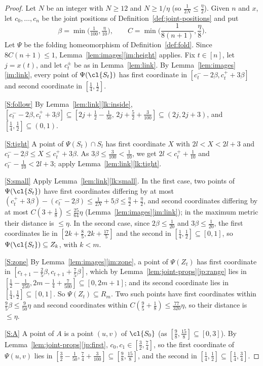 \begin{proof}
Let $N$ be an integer with $N\ge12$ and $N\ge1/\eta$ (so $\frac1{2N}\le\frac\eta2$). Given $n$ and $x$,
let $c_0,\dots,c_n$ be the joint positions of Definition~\ref{def:joint-positions} and put
\[
\beta=\min\big(\tfrac1{100},\tfrac\eta{10}\big),\qquad C=\min\Big(\frac1{8(n+1)},\frac\eta8\Big).
\]
Let $\Psi$ be the folding homeomorphism of Definition~\ref{def:fold}. Since $8C(n+1)\le1$,
Lemma~\ref{lem:images}\ref{im:height} applies. Fix $t\in[n]$, let $j=x(t)$, and let
$c_t^\pm$ be as in Lemma~\ref{lem:link}. By Lemma~\ref{lem:images}\ref{im:link}, every point of
$\Psi(\cl{S_t})$ has first coordinate in $[c_t^--2\beta,c_t^++3\beta]$ and second coordinate in
$[\frac14,\frac12]$.

\ref{S:follow} By Lemma~\ref{lem:link}\ref{lk:inside}, $[c_t^--2\beta,c_t^++3\beta]\subseteq
[2j+\frac12-\frac1{50},\,2j+\frac52+\frac3{100}]\subseteq(2j,2j+3)$, and $[\frac14,\frac12]\subseteq(0,1)$.

\ref{S:tight} A point of $\Psi(S_t)\cap S_l$ has first coordinate $X$ with $2l<X<2l+3$ and
$c_t^--2\beta\le X\le c_t^++3\beta$. As $3\beta\le\frac3{100}<\frac1{10}$, we get
$2l<c_t^++\frac1{10}$ and $c_t^--\frac1{10}<2l+3$; apply Lemma~\ref{lem:link}\ref{lk:tight}.

\ref{S:small} Apply Lemma~\ref{lem:link}\ref{lk:small}. In the first case, two points of
$\Psi(\cl{S_t})$ have first coordinates differing by at most $(c_t^++3\beta)-(c_t^--2\beta)\le
\frac1{2N}+5\beta\le\frac\eta2+\frac\eta2$, and second coordinates differing by at most
$C(3+\frac18)\le\frac{25}{64}\eta$ (Lemma~\ref{lem:images}\ref{im:link}); in the maximum metric
their distance is $\le\eta$. In the second case, since $2\beta\le\frac1{20}$ and $3\beta\le\frac1{20}$,
the first coordinates lie in $[2k+\frac85,2k+\frac{17}5]$ and the second in $[\frac14,\frac12]\subseteq
[0,1]$, so $\Psi(\cl{S_t})\subseteq Z_k$, with $k<m$.

\ref{S:zone} By Lemma~\ref{lem:images}\ref{im:zone}, a point of $\Psi(Z_t)$ has first coordinate in
$[c_{t+1}-\frac25\beta,c_{t+1}+\frac75\beta]$, which by Lemma~\ref{lem:joint-props}\ref{jp:range}
lies in $[\frac12-\frac1{250},2m-\frac14+\frac7{500}]\subseteq[0,2m+1]$; and its second coordinate
lies in $[\frac14,\frac12]\subseteq[0,1]$. So $\Psi(Z_t)\subseteq R_m$. Two such points have first
coordinates within $\frac95\beta\le\frac9{50}\eta$ and second coordinates within
$C(\frac95+\frac18)\le\frac{77}{320}\eta$, so their distance is $\le\eta$.

\ref{S:A} A point of $A$ is a point $(u,v)$ of $\cl{S_0}$ (as $[\frac98,\frac{15}8]\subseteq[0,3]$).
By Lemma~\ref{lem:joint-props}\ref{jp:first}, $c_0,c_1\in[\frac32,\frac74]$, so the first coordinate
of $\Psi(u,v)$ lies in $[\frac32-\frac1{50},\frac74+\frac3{100}]\subseteq[\frac98,\frac{15}8]$, and the
second in $[\frac14,\frac12]\subseteq[\frac14,\frac34]$.


\end{proof}
